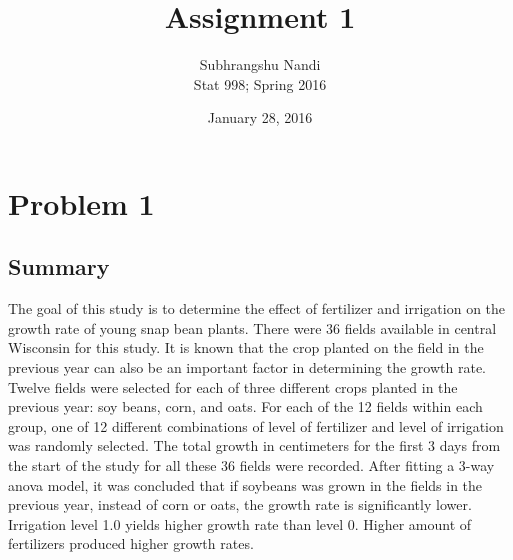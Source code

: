 \documentclass[11pt,a4paper]{article}
\begin{document}
\title{Assignment 1}
\author{Subhrangshu Nandi\\
  Stat 998; Spring 2016}
\date{January 28, 2016}

\maketitle

\section*{Problem 1}

\subsection*{Summary}
The goal of this study is to determine the effect of fertilizer and irrigation on the growth rate of young snap bean plants. There were 36 fields available in central Wisconsin for this study. It is known that the crop planted on the field in the previous year can also be an important factor in determining the growth rate. Twelve fields were selected for each of three different crops planted in the previous year: soy beans, corn, and oats. For each of the 12 fields within each group, one of 12 different combinations of level of fertilizer and level of irrigation was randomly selected. The total growth in centimeters for the first 3 days from the start of the study for all these 36 fields were recorded. After fitting a 3-way anova model, it was concluded that if soybeans was grown in the fields in the previous year, instead of corn or oats, the growth rate is significantly lower. Irrigation level 1.0 yields higher growth rate than level 0. Higher amount of fertilizers produced higher growth rates. 
\end{document}
